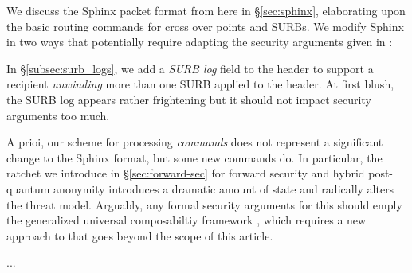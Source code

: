 We discuss the Sphinx packet format from \cite{Sphinx} here in
\S\ref{sec:sphinx}, elaborating upon the basic routing commands
for cross over points and SURBs.
%
We modify Sphinx in two ways that potentially require adapting
the security arguments given in \cite{FormalOnion}: 

In \S\ref{subsec:surb_logs}, we add a {\em SURB log} field to the
header to support a recipient {\em unwinding} more than one SURB
applied to the header.  At first blush, the SURB log appears rather
frightening but it should not impact security arguments too much.

A prioi, our scheme for processing {\em commands} does not represent
a significant change to the Sphinx format, but some new commands do.
In particular, the ratchet we introduce in \S\ref{sec:forward-sec}
for forward security and hybrid post-quantum anonymity introduces a
dramatic amount of state and radically alters the threat model.
Arguably, any formal security arguments for this should emply the 
generalized universal composabiltiy framework \cite{GenUC}, which
requires a new approach to \cite{FormalOnion} that goes beyond the
scope of this article. 

...


